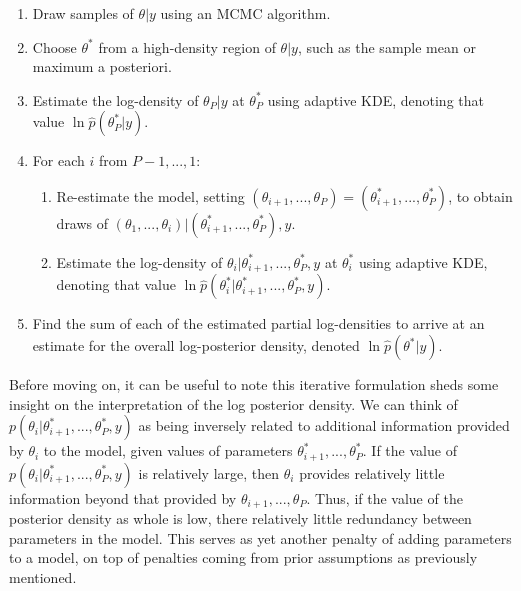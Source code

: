 \documentclass[twocolumn]{article}
\begin{document}
\begin{enumerate}[noitemsep]
	\item Draw samples of $\theta|y$ using an MCMC algorithm.
	\item Choose $\theta^*$ from a high-density region of $\theta|y$, such as the sample mean or maximum a posteriori.
	\item Estimate the log-density of $\theta_P|y$ at $\theta_P^*$ using adaptive KDE, denoting that value $\ln \hat{p}(\theta_P^*|y)$.
	\item For each $i$ from $P-1, ..., 1$:
		\begin{enumerate}
			\item Re-estimate the model, setting $(\theta_{i+1}, ..., \theta_P) = (\theta_{i+1}^*, ..., \theta_P^*)$, to obtain draws of $(\theta_1, ..., \theta_i)|(\theta_{i+1}^*, ..., \theta_P^*), y$.
			\item Estimate the log-density of $\theta_i|\theta_{i+1}^*, ..., \theta_P^*, y$ at $\theta_i^*$ using adaptive KDE, denoting that value $\ln \hat{p}(\theta_i^*|\theta_{i+1}^*, ..., \theta_P^*, y)$.
		\end{enumerate}
	\item Find the sum of each of the estimated partial log-densities to arrive at an estimate for the overall log-posterior density, denoted $\ln \hat{p}(\theta^*|y)$.
\end{enumerate}

Before moving on, it can be useful to note this iterative formulation sheds some insight on the interpretation of the log posterior density. We can think of $p(\theta_i|\theta_{i+1}^*, ..., \theta_P^*, y)$ as being inversely related to additional information provided by $\theta_i$ to the model, given values of parameters $\theta_{i+1}^*, ..., \theta_P^*$. If the value of $p(\theta_i|\theta_{i+1}^*, ..., \theta_P^*, y)$ is relatively large, then $\theta_i$ provides relatively little information beyond that provided by $\theta_{i+1}, ..., \theta_P$. Thus, if the value of the posterior density as whole is low, there relatively little redundancy between parameters in the model. This serves as yet another penalty of adding parameters to a model, on top of penalties coming from prior assumptions as previously mentioned.
\end{document}
